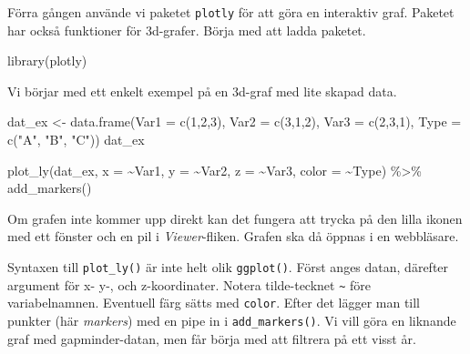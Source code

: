 \documentclass[
]{book}
\newenvironment{Shaded}{\begin{snugshade}}{\end{snugshade}}
\newcommand{\AttributeTok}[1]{\textcolor[rgb]{0.77,0.63,0.00}{#1}}
\newcommand{\DecValTok}[1]{\textcolor[rgb]{0.00,0.00,0.81}{#1}}
\newcommand{\FunctionTok}[1]{\textcolor[rgb]{0.00,0.00,0.00}{#1}}
\newcommand{\NormalTok}[1]{#1}
\newcommand{\OtherTok}[1]{\textcolor[rgb]{0.56,0.35,0.01}{#1}}
\newcommand{\SpecialCharTok}[1]{\textcolor[rgb]{0.00,0.00,0.00}{#1}}
\newcommand{\StringTok}[1]{\textcolor[rgb]{0.31,0.60,0.02}{#1}}
\theoremstyle{definition}
\theoremstyle{definition}
\theoremstyle{definition}
\theoremstyle{definition}
\theoremstyle{remark}
\begin{document}
Förra gången använde vi paketet \texttt{plotly} för att göra en interaktiv graf. Paketet har också funktioner för 3d-grafer. Börja med att ladda paketet.

\begin{Shaded}
\begin{Highlighting}[]
\FunctionTok{library}\NormalTok{(plotly)}
\end{Highlighting}
\end{Shaded}

Vi börjar med ett enkelt exempel på en 3d-graf med lite skapad data.

\begin{Shaded}
\begin{Highlighting}[]
\NormalTok{dat\_ex }\OtherTok{\textless{}{-}} \FunctionTok{data.frame}\NormalTok{(}\AttributeTok{Var1 =} \FunctionTok{c}\NormalTok{(}\DecValTok{1}\NormalTok{,}\DecValTok{2}\NormalTok{,}\DecValTok{3}\NormalTok{), }\AttributeTok{Var2 =} \FunctionTok{c}\NormalTok{(}\DecValTok{3}\NormalTok{,}\DecValTok{1}\NormalTok{,}\DecValTok{2}\NormalTok{), }\AttributeTok{Var3 =} \FunctionTok{c}\NormalTok{(}\DecValTok{2}\NormalTok{,}\DecValTok{3}\NormalTok{,}\DecValTok{1}\NormalTok{), }\AttributeTok{Type =} \FunctionTok{c}\NormalTok{(}\StringTok{"A"}\NormalTok{, }\StringTok{"B"}\NormalTok{, }\StringTok{"C"}\NormalTok{))}
\NormalTok{dat\_ex}

\FunctionTok{plot\_ly}\NormalTok{(dat\_ex, }\AttributeTok{x =} \SpecialCharTok{\textasciitilde{}}\NormalTok{Var1, }\AttributeTok{y =} \SpecialCharTok{\textasciitilde{}}\NormalTok{Var2, }\AttributeTok{z =} \SpecialCharTok{\textasciitilde{}}\NormalTok{Var3, }\AttributeTok{color =} \SpecialCharTok{\textasciitilde{}}\NormalTok{Type) }\SpecialCharTok{\%\textgreater{}\%} 
  \FunctionTok{add\_markers}\NormalTok{()}
\end{Highlighting}
\end{Shaded}

Om grafen inte kommer upp direkt kan det fungera att trycka på den lilla ikonen med ett fönster och en pil i \emph{Viewer}-fliken. Grafen ska då öppnas i en webbläsare.

Syntaxen till \texttt{plot\_ly()} är inte helt olik \texttt{ggplot()}. Först anges datan, därefter argument för x- y-, och z-koordinater. Notera tilde-tecknet \texttt{\textasciitilde{}} före variabelnamnen. Eventuell färg sätts med \texttt{color}. Efter det lägger man till punkter (här \emph{markers}) med en pipe in i \texttt{add\_markers()}. Vi vill göra en liknande graf med gapminder-datan, men får börja med att filtrera på ett visst år.
\end{document}
